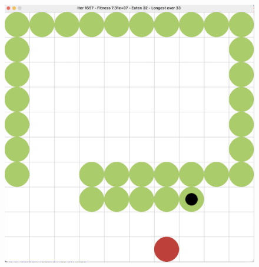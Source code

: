 \documentclass[10pt]{beamer}
\begin{document}
\begin{frame}
\begin{columns}[T]
\begin{column}{0.26\textwidth}
\begin{figure}
\vspace{-0.4cm}
\includegraphics[width=1\textwidth]{snake_game.png}
\end{figure}
\end{column}
\end{columns}
\end{frame}
\end{document}
